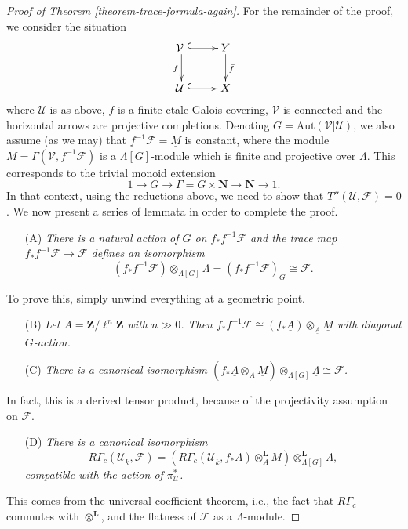 \begin{proof}[Proof of Theorem \ref{theorem-trace-formula-again}]
\medskip\noindent
For the remainder of the proof, we consider the situation
$$
\xymatrix{
{\mathcal{V} \ } \ar_f[d] \ar@{^(->}[r] & Y \ar^{\bar f}[d] \\	
{\mathcal{U} \ } \ar@{^(->}[r] & X
}
$$
where $\mathcal{U}$ is as above, $f$ is a finite etale Galois covering,
$\mathcal{V}$ is connected and the horizontal arrows are projective
completions. Denoting $G=\text{Aut}(\mathcal{V}|\mathcal{U})$, we also assume
(as we may) that $f^{-1}\mathcal{F} =\underline M$ is constant, where the
module $M = \Gamma(\mathcal{V}, f^{-1}\mathcal{F})$ is a $\Lambda[G]$-module
which is finite and projective over $\Lambda$. This corresponds to the trivial
monoid extension
$$
1\to G\to \Gamma=G\times \mathbf{N}\to \mathbf{N}\to 1.
$$
In that context, using the reductions above, we need to show that
$T''(\mathcal{U},\mathcal{F})=0$. We now present a series of lemmata in order
to complete the proof.
\begin{enumerate}
\item[(A)]
{\it There is a natural action of $G$ on $f_*f^{-1}\mathcal{F}$ and the trace
map $f_*f^{-1}\mathcal{F}\to \mathcal{F}$ defines an isomorphism
$$
(f_*f^{-1}\mathcal{F})\otimes_{\Lambda[G]} \Lambda=(f_*f^{-1}\mathcal{F})_G
\cong \mathcal{F}.
$$
}
\end{enumerate}
To prove this, simply unwind everything at a geometric point.
\begin{enumerate}
\item[(B)]
{\it
Let $A=\mathbf{Z}/\ell^n \mathbf{Z}$ with $n\gg 0$. Then $f_*f^{-1}\mathcal{F}
\cong (f_*\underline A)\otimes_{\underline A} \underline M$ with diagonal
$G$-action.
}
\end{enumerate}
\begin{enumerate}
\item[(C)]
{\it There is a canonical isomorphism
$(f_*\underline A \otimes_{\underline A} \underline M)
\otimes_{\Lambda[G]} \underline \Lambda \cong \mathcal{F}$.
}
\end{enumerate}
In fact, this is a derived tensor product, because of the projectivity
assumption on $\mathcal{F}$.
\begin{enumerate}
\item[(D)]
{\it
There is a canonical isomorphism
$$
R\Gamma_c(\mathcal{U}_{\bar k}, \mathcal{F})
= (R\Gamma_c(\mathcal{U}_{\bar k}, f_*A)\otimes_A^\mathbf{L}
M)\otimes_{\Lambda[G]}^\mathbf{L} \Lambda,
$$
compatible with the action of $\pi^*_\mathcal{U}$.
}
\end{enumerate}
This comes from the universal coefficient theorem, i.e., the fact that
$R\Gamma_c$ commutes with $\otimes^\mathbf{L}$, and the flatness of
$\mathcal{F}$ as a $\Lambda$-module.


\end{proof}
